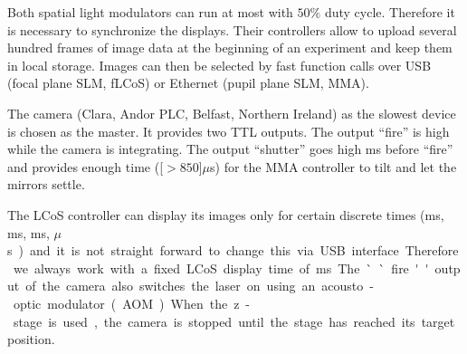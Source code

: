 Both spatial light modulators can run at most with $50\%$ duty         
cycle. Therefore it is necessary to synchronize the displays. Their
controllers allow to upload several hundred frames of image data at
the beginning of an experiment and keep them in local storage. Images
can then be selected by fast function calls over USB (focal plane SLM,
fLCoS) or Ethernet (pupil plane SLM, MMA).

The camera (Clara, Andor PLC, Belfast, Northern Ireland) as the        
slowest device is chosen as the master. It provides two TTL
outputs. The output ``fire'' is high while the camera is
integrating. The output ``shutter'' goes high \unit[1]{ms} before
``fire'' and provides enough time (\unit[$>850$]{$\mu$s}) for the MMA
controller to tilt and let the mirrors settle.

The LCoS controller can display its images only for certain discrete    
times (\unit[20]{ms}, \unit[10]{ms}, \unit[5]{ms}, \unit[200]{$\mu$s})
and it is not straight forward to change this via USB
interface. Therefore we always work with a fixed LCoS display time of
\unit[20]{ms}. The ``fire'' output of the camera also switches the
laser on using an acousto-optic modulator (AOM).

When the z-stage is used, the camera is stopped until the stage has
reached its target position.














